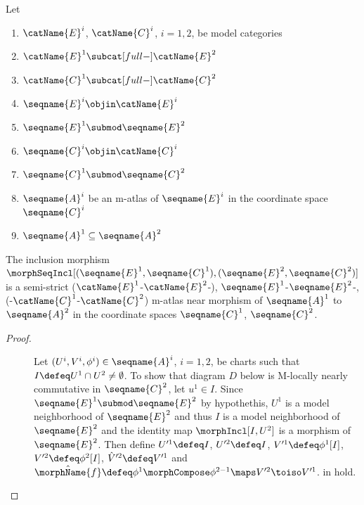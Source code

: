 \documentclass{article}
\begin{document}
\begin{lemma}
\label{lem:M-ATLid}
Let
\begin{enumerate}
\item
$\catName{E}^i$, $\catName{C}^i$, $i=1,2$, be model categories
\item
$\catName{E}^1 \subcat[full-] \catName{E}^2$
\item
$\catName{C}^1 \subcat[full-] \catName{C}^2$
\item
$\seqname{E}^i \objin \catName{E}^i$
\item
$\seqname{E}^1 \submod \seqname{E}^2$
\item
$\seqname{C}^i \objin \catName{C}^i$
\item
$\seqname{C}^1 \submod \seqname{C}^2$
\item
$\seqname{A}^i$ be an m-atlas of $\seqname{E}^i$ in the coordinate space
$\seqname{C}^i$
\item
$\seqname{A}^1 \subseteq \seqname{A}^2$
\end{enumerate}

The inclusion morphism
$
  \morphSeqIncl%
    [
      {(\seqname{E}^1, \seqname{C}^1)},
      {(\seqname{E}^2, \seqname{C}^2)}
    ]
$
is a semi-strict
\nobreaks
  {
    {($\catName{E}^1$-$\catName{E}^2$-)},
    {$\seqname{E}^1$-$\seqname{E}^2$-},
    {(-$\catName{C}^1$-$\catName{C}^2$)}
  }
m-atlas near morphism of
$\seqname{A}^1$ to $\seqname{A}^2$ in the coordinate spaces
$\seqname{C}^1$, $\seqname{C}^2$.

\begin{proof}
\begin{description}

\item%
  [
    \ensuremath
      {
        \morphSeqIncl%
          [
            {(\seqname{E}^1, \seqname{C}^1)},
            {(\seqname{E}^2, \seqname{C}^2)}
          ]
      }
    is an m-atlas near morphism:
  ]

Let $(U^i,V^i,\phi^i) \in \seqname{A}^i$, $i=1,2$, be charts such that
$I \defeq U^1 \cap U^2 \neq \emptyset$. To show that diagram $D$ below
is M-locally nearly commutative in $\seqname{C}^2$,
let $u^1 \in I$. Since $\seqname{E}^1 \submod \seqname{E}^2$ by
hypothethis, $U^1$ is a model neighborhood of $\seqname{E}^2$ and thus
$I$ is a model neighborhood of $\seqname{E}^2$ and the identity map
$\morphIncl[I,U^2]$ is a morphism of $\seqname{E}^2$. Then define
$U'^1 \defeq I$, $U'^2 \defeq I$, $V'^1 \defeq \phi^1[I]$,
$V'^2 \defeq \phi^2[I]$, $\hat{V}'^2 \defeq V'^1$ and
$
  \hat{\morphName{f}} \defeq
  \phi^1 \morphCompose \phi^{2-1} \maps V'^2 \toiso V'^1
$.
 in  hold.


\end{description}
\end{proof}
\end{lemma}
\end{document}
